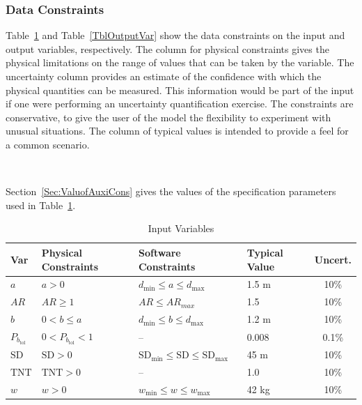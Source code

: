 \documentclass[12pt]{article}
\begin{document}
\subsubsection{Data Constraints} \label{sec_DataConstraints}

Table~\ref{TblInputVar} and Table~\ref{TblOutputVar} show the data constraints on the input and output variables, respectively. The column for physical 
constraints gives the physical limitations on the range of values that can be 
taken by the variable. The uncertainty column provides an estimate of the 
confidence with which the physical quantities can be measured. This information 
would be part of the input if one were performing an uncertainty quantification 
exercise. The constraints are conservative, to give the user of the model the 
flexibility to experiment with unusual situations. The column of typical values 
is intended to provide a feel for a common scenario.

~\newline

Section~\ref{Sec:ValuofAuxiCons} gives the values of the specification parameters used
in Table~\ref{TblInputVar}.

\begin{table}[!h]
\caption{Input Variables} \label{TblInputVar}
\renewcommand{\arraystretch}{1.2}
\begin{tabular}{l l l l c} 
\toprule
\textbf{Var} & \textbf{Physical Constraints} & \textbf{Software Constraints} & \textbf{Typical Value} & \textbf{Uncert.} \\
\midrule 
$a$&$a > 0 $ & $d_{\text{min}} \leq a \leq d_{\text{max}}$ 
                           & 1.5 \si[per-mode=symbol] {\metre}& 10\%\\

$AR$& $AR \geq 1$ & $AR \leq AR_{max}$ & 1.5 & 10\%\\
                           
$b$&$0 < b \leq a$ & $d_{\text{min}} \leq b \leq d_{\text{max}}$ 
                           & 1.2 \si[per-mode=symbol]{\metre}& 10\%\\
 
$P_{b_{\text{tol}}}$& $0 < P_{b_{\text{tol}}} < 1$& --& 0.008 &0.1\%\\

$\text{SD}$&$\text{SD}>0$&$\text{SD}_{\text{min}} \leq \text{SD} \leq \text{SD}_{\text{max}}$&45
\si[per-mode=symbol]{\meter}&10\%\\

$\text{TNT}$&$\text{TNT}>0$&--&1.0&10\%\\


$w$&$w > 0$ & $w_{\text{min}} \le w \le w_{\text{max}}$&42 \si[per-mode=symbol]{\kilo\gram}&10\%\\

\bottomrule
\end{tabular}
\end{table}
\end{document}
